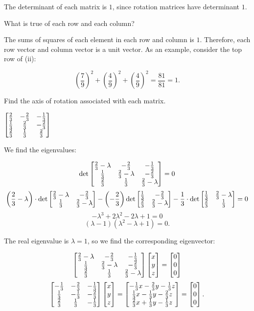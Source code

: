 \documentclass[../gatm_answers.tex]{subfiles}
\begin{document}
{{The determinant of each matrix is $1$, since rotation matrices have determinant $1$.

\begin{inner_problem}
\item What is true of each row and each column?
\end{inner_problem}

The sums of squares of each element in each row and column is $1$. Therefore, each row vector and column vector is a unit vector. As an example, consider the top row of (ii):

$$\left(\frac{7}{9}\right)^2+\left(\frac{4}{9}\right)^2+\left(\frac{4}{9}\right)^2 = \frac{81}{81} = 1.$$

\begin{inner_problem}
\item Find the axis of rotation associated with each matrix.
\end{inner_problem}

\begin{iinner_problem}[start=1]
\item $\begin{bmatrix} \frac{2}{3} & -\frac{2}{3} & -\frac{1}{3} \\ \frac{1}{3} & \frac{2}{3} & -\frac{2}{3} \\ \frac{2}{3} & \frac{1}{3} & \frac{2}{3} \end{bmatrix}$
\end{iinner_problem}

We find the eigenvalues:

$$\det \begin{bmatrix} \frac{2}{3}-\lambda & -\frac{2}{3} & -\frac{1}{3} \\ \frac{1}{3} & \frac{2}{3}-\lambda & -\frac{2}{3} \\ \frac{2}{3} & \frac{1}{3} & \frac{2}{3}-\lambda \end{bmatrix} = 0$$
$$\left(\frac{2}{3}-\lambda\right)\cdot\det \begin{bmatrix} \frac{2}{3}-\lambda & -\frac{2}{3} \\ \frac{1}{3} & \frac{2}{3}-\lambda \end{bmatrix} - \left(-\frac{2}{3}\right)\det \begin{bmatrix} \frac{1}{3} & -\frac{2}{3} \\ \frac{2}{3} & \frac{2}{3}-\lambda \end{bmatrix} - \frac{1}{3} \cdot \det \begin{bmatrix} \frac{1}{3} & \frac{2}{3}-\lambda \\ \frac{2}{3} & \frac{1}{3} \end{bmatrix}=0$$
$$-\lambda^3 + 2 \lambda^2 - 2 \lambda + 1=0$$
$$(\lambda - 1)(\lambda^2 - \lambda + 1)=0.$$

The real eigenvalue is $\lambda = 1$, so we find the corresponding eigenvector:

$$\begin{bmatrix} \frac{2}{3}-\lambda & -\frac{2}{3} & -\frac{1}{3} \\ \frac{1}{3} & \frac{2}{3}-\lambda & -\frac{2}{3} \\ \frac{2}{3} & \frac{1}{3} & \frac{2}{3}-\lambda \end{bmatrix}\begin{bmatrix} x \\ y \\ z \end{bmatrix} = \begin{bmatrix} 0 \\ 0 \\ 0 \end{bmatrix}$$
$$\begin{bmatrix} -\frac{1}{3} & -\frac{2}{3} & -\frac{1}{3} \\ \frac{1}{3} & -\frac{1}{3} & -\frac{2}{3} \\ \frac{2}{3} & \frac{1}{3} & -\frac{1}{3} \end{bmatrix}\begin{bmatrix} x \\ y \\ z \end{bmatrix} = \begin{bmatrix} -\frac{1}{3}x -\frac{2}{3}y - \frac{1}{3}z \\ \frac{1}{3}x-\frac{1}{3}y-\frac{2}{3}z \\ \frac{2}{3}x + \frac{1}{3}y - \frac{1}{3}z \end{bmatrix} = \begin{bmatrix} 0 \\ 0 \\ 0 \end{bmatrix}.$$

}}
\end{document}
